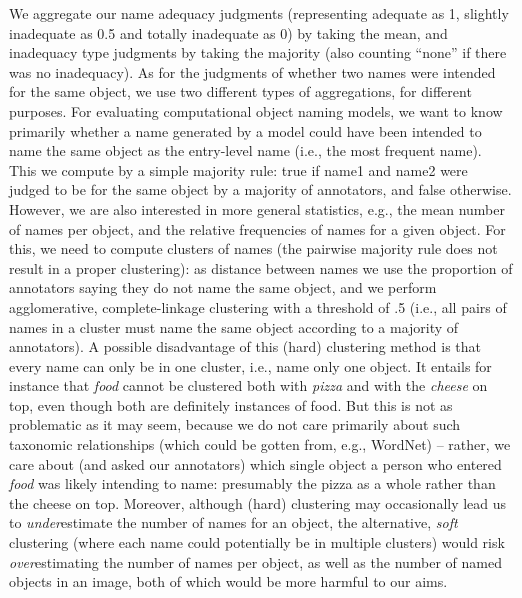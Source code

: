 We aggregate our name adequacy judgments (representing adequate as 1, slightly inadequate as 0.5 and totally inadequate as 0) by taking the mean, and inadequacy type judgments by taking the majority (also counting ``none'' if there was no inadequacy).
As for the judgments of whether two names were intended for the same object, we use two different types of aggregations, for different purposes.
For evaluating computational object naming models, we want to know primarily whether a name generated by a model could have been intended to name the same object as the entry-level name (i.e., the most frequent name).
This we compute by a simple majority rule: true if name1 and name2 were judged to be for the same object by a majority of annotators, and false otherwise.
However, we are also interested in more general statistics, e.g., the mean number of names per object, and the relative frequencies of names for a given object.
For this, we need to compute clusters of names (the pairwise majority rule does not result in a proper clustering): as distance between names we use the proportion of annotators saying they do not name the same object, and we perform agglomerative, complete-linkage clustering with a threshold of .5 (i.e., all pairs of names in a cluster must name the same object according to a majority of annotators).
A possible disadvantage of this (hard) clustering method is that every name can only be in one cluster, i.e., name only one object.
It entails for instance that \emph{food} cannot be clustered both with \emph{pizza} and with the \emph{cheese} on top, even though both are definitely instances of food.
But this is not as problematic as it may seem, because we do not care primarily about such taxonomic relationships (which could be gotten from, e.g., WordNet) -- rather, we care about (and asked our annotators) which single object a person who entered \emph{food} was likely intending to name: presumably the pizza as a whole rather than the cheese on top.
Moreover, although (hard) clustering may occasionally lead us to \emph{under}estimate the number of names for an object, the alternative, \emph{soft} clustering (where each name could potentially be in multiple clusters) would risk \emph{over}estimating the number of names per object, as well as the number of named objects in an image, both of which would be more harmful to our aims.



